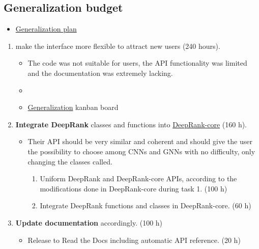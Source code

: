 \subsection*{Generalization budget}

\bigskip

\begin{itemize}
\item \href{https://nlesc.sharepoint.com/:w:/s/all/ERrdfYPm_2ZOgUUXyXRxx7wBuZIZJNIKS9pSH20kdDMdig?e=VS0mTQ}{Generalization plan}
\end{itemize}
\begin{enumerate}[start=1,leftmargin=.8in,label={\bfseries \textbullet{} Task \arabic*:}]
    \item make the interface more flexible to attract new users (240 hours).
    \begin{itemize}[label=o]
        \item The code was not suitable for users, the API functionality was limited and the documentation was extremely lacking.
        \item {}
        \item \href{https://github.com/DeepRank/deeprank-core/projects/6}{Generalization} kanban board
    \end{itemize}
    \item \textbf{Integrate DeepRank} classes and functions into \href{https://github.com/DeepRank/deeprank-core/blob/class_diagram/deeprankcore/uml/classes_npl.svg}{DeepRank-core} (160 h).
    \begin{itemize}
        \item Their API should be very similar and coherent and should give the user the
possibility to choose among CNNs and GNNs with no difficulty, only changing the classes called.
        \begin{enumerate}[label=\roman*.]
            \item Uniform DeepRank and DeepRank-core APIs, according to the modifications done
in DeepRank-core during task 1. (100 h)
            \item Integrate DeepRank functions and classes in DeepRank-core. (60 h)
        \end{enumerate}
    \end{itemize} 
    \item \textbf{Update documentation} accordingly. (100 h)
    \begin{itemize}[label=o]
        \item Release to Read the Docs including automatic API reference. (20 h)

\end{itemize}
\end{enumerate}
